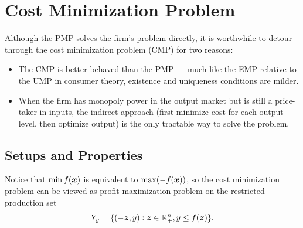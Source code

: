 
\section{Cost Minimization Problem}\label{cost-minimization-problem}

Although the PMP solves the firm's problem directly, it is worthwhile
to detour through the cost minimization problem (CMP) for two reasons:

\begin{itemize}
\item
  The CMP is better-behaved than the PMP — much like the EMP relative
  to the UMP in consumer theory, existence and uniqueness conditions
  are milder.
\item
  When the firm has monopoly power in the output market but is still a
  price-taker in inputs, the indirect approach (first minimize cost
  for each output level, then optimize output) is the only tractable
  way to solve the problem.
\end{itemize}

\subsection{Setups and Properties}

Notice that \(\min f(\bm x)\) is equivalent to \(\max (-f(\bm x))\), so the
cost minimization problem can be viewed as profit maximization
problem on the restricted production set
\[Y_y = \{(-\bm z,y):\bm z\in\mathbb R_+^n,y\le f(\bm z) \}.\]

